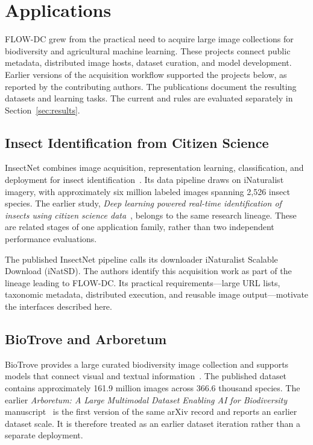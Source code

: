 \section{Applications}\label{sec:applications}
FLOW-DC grew from the practical need to acquire large image collections for biodiversity and agricultural machine learning. These projects connect public metadata, distributed image hosts, dataset curation, and model development. Earlier versions of the acquisition workflow supported the projects below, as reported by the contributing authors. The publications document the resulting datasets and learning tasks. The current \ratio{} and \paarc{} rules are evaluated separately in Section~\ref{sec:results}.

\subsection{Insect Identification from Citizen Science}
InsectNet combines image acquisition, representation learning, classification, and deployment for insect identification~\cite{insectnet}. Its data pipeline draws on iNaturalist imagery, with approximately six million labeled images spanning 2,526 insect species. The earlier study, \emph{Deep learning powered real-time identification of insects using citizen science data}~\cite{insect-preprint}, belongs to the same research lineage. These are related stages of one application family, rather than two independent performance evaluations.

The published InsectNet pipeline calls its downloader iNaturalist Scalable Download (iNatSD). The authors identify this acquisition work as part of the lineage leading to FLOW-DC. Its practical requirements---large URL lists, taxonomic metadata, distributed execution, and reusable image output---motivate the interfaces described here.

\subsection{BioTrove and Arboretum}
BioTrove provides a large curated biodiversity image collection and supports models that connect visual and textual information~\cite{biotrove,clip}. The published dataset contains approximately 161.9 million images across 366.6 thousand species. The earlier \emph{Arboretum: A Large Multimodal Dataset Enabling AI for Biodiversity} manuscript~\cite{arboretum} is the first version of the same arXiv record and reports an earlier dataset scale. It is therefore treated as an earlier dataset iteration rather than a separate deployment.

